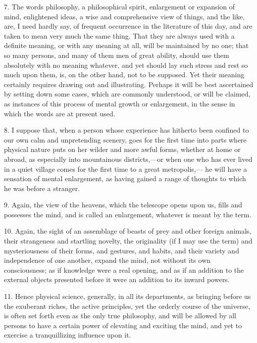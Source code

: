 7. The words philosophy, a philosophical spirit, enlargement or
expansion of mind, enlightened ideas, a wise and comprehensive view of
things, and the like, are, I need hardly say, of frequent occurrence
in the literature of this day, and are taken to mean very much the
same thing. That they are always used with a definite meaning, or with
any meaning at all, will be maintained by no one; that so many
persons, and many of them men of great ability, should use them
absolutely with no meaning whatever, and yet should lay such stress
and rest so much upon them, is, on the other hand, not to be supposed.
Yet their meaning certainly requires drawing out and illustrating.
Perhaps it will be best ascertained by setting down some cases, which
are commonly understood, or will be claimed, as instances of this
process of mental growth or enlargement, in the sense in which the
words are at present used.

8. I suppose that, when a person whose experience has hitherto been
confined to our own calm and unpretending scenery, goes for the first
time into parts where physical nature puts on her wilder and more
awful forms, whether at home or abroad, as especially into mountainous
districts,—or when one who has ever lived in a quiet village comes
for the first time to a great metropolis,— he will have a sensation
of mental enlargement, as having gained a range of thoughts to which
he was before a stranger.

9. Again, the view of the heavens, which the telescope opens upon
us, fills and possesses the mind, and is called an enlargement,
whatever is meant by the term.

10. Again, the sight of an assemblage of beasts of prey and other
foreign animals, their strangeness and startling novelty, the
originality (if I may use the term) and mysteriousness of their forms,
and gestures, and habits, and their variety and independence of one
another, expand the mind, not without its own consciousness; as if
knowledge were a real opening, and as if an addition to the external
objects presented before it were an addition to its inward powers.

11. Hence physical science, generally, in all its departments, as
bringing before us the exuberant riches, the active principles, yet
the orderly course of the universe, is often set forth even as the
only true philosophy, and will be allowed by all persons to have a
certain power of elevating and exciting the mind, and yet to exercise
a tranquillizing influence upon it.

